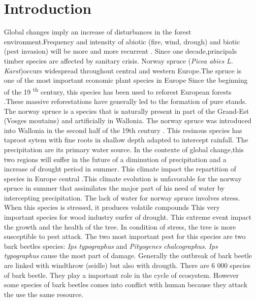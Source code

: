 \documentclass[3p,procedia]{elsarticle}
\begin{document}
\linenumbers

\pagebreak
\section{Introduction}


Global changes imply an increase of disturbances in the forest environment.Frequency and intensity of abiotic (fire, wind, drough) and biotic (pest invasion) will be more and more recurrent \citep{lindner_climate_2010}. Since one decade,principals timber species are affected by sanitary crisis.
Norway spruce (\textit{Picea abies L. Karst})occurs widespread throughout central and western Europe.The spruce is one of the most important economic plant species in Europe \citep{nystedt_norway_2013}
Since the beginning of the 19 \textsuperscript{th} century, this species has been used to reforest European forests
\citep{3PresentDistributionofSecondaryNorwaySpruceinEurope}.These massive reforestations have generally led to the formation of pure stands. The norway spruce is a species that is naturally present in part of the Grand-Est (Vosges moutains)  and artificially  in Wallonia. 
The norway spruce was introduced into Wallonia in the second half of the 19th century \citep{Noirfalise_1975}.
This resinous species has taproot sytem with fine roots in shallow depth adapted to intercept rainfall. The precipitation are its primary water source.
In the contexte of global change,this two regions will suffer in the future of a diminution of precipitation and a increase of drought period in summer. This climate impact the repartition of species in Europe central \citep{hanewinkel2013climate}.This climate evolution is unfavorable for the norway spruce in summer that assimilates the major part of his need of water by intercepting precipitation. The lack of water for norway spruce involves stress. When this species is stressed, it produces volatile compounds %
This very important species for wood industry surfer of drought. This extreme event impact the growth and the health of the tree. In condition of stress, the tree is more susceptible to pest attack. The two most important pest for this species are two  bark beetles species: \textit{Ips typographus} and \textit{Pityogenes chalcographus}. \textit{Ips typographus} cause the most part of damage. Generally the outbreak of bark beetle are linked with windthrow (seidle) but also with drougth. There are 6 000 species of bark beetle. They play a important role in the cycle of ecosystem. However some species of bark beetles comes into conflict with human because they attack the use the same resource\citep{raffa_natural_2015}.%
\end{document}
